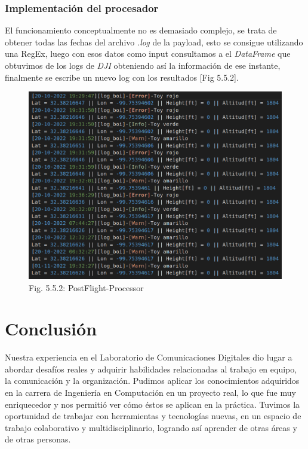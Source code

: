\documentclass[12pt]{article}
\begin{document}
\subsubsection{Implementación del procesador}
El funcionamiento conceptualmente no es demasiado complejo, se trata de obtener todas las fechas del archivo \textit{.log} de la payload, esto se consigue utilizando una RegEx, luego con esos datos como input consultamos a el \textit{DataFrame} que obtuvimos de los logs de \textit{DJI} obteniendo así la información de ese instante, finalmente se escribe un nuevo log con los resultados [Fig 5.5.2].

\begin{figure}[ht]
  \centering
    \includegraphics[scale=0.5]{images/post-flight-processor.png}
    \caption{Fig. 5.5.2: PostFlight-Processor}
\end{figure}

\section{Conclusión}
Nuestra experiencia en el Laboratorio de Comunicaciones Digitales dio lugar a abordar desafíos reales y adquirir habilidades relacionadas al trabajo en equipo, la comunicación y la organización. Pudimos aplicar los conocimientos adquiridos en la carrera de Ingeniería en Computación en un proyecto real, lo que fue muy enriquecedor y nos permitió ver cómo éstos se aplican en la práctica. Tuvimos la oportunidad de trabajar con herramientas y tecnologías nuevas, en un espacio de trabajo colaborativo y multidisciplinario, logrando así aprender de otras áreas y de otras personas.
\end{document}
